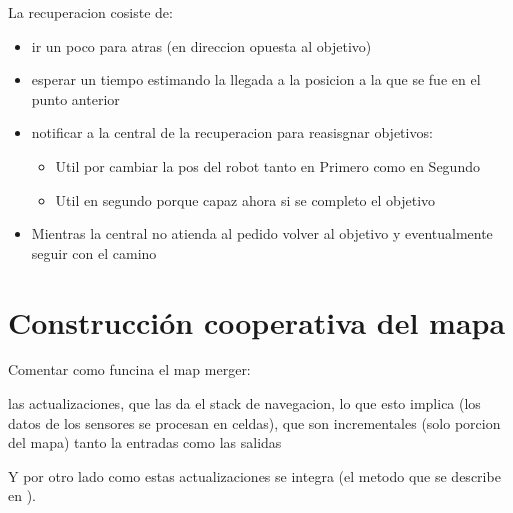 La recuperacion cosiste de:
\begin{itemize}
  \item  ir un poco para atras (en direccion opuesta al objetivo)
  \item  esperar un tiempo estimando la llegada a la posicion a la que se fue en el punto anterior
  \item  notificar a la central de la recuperacion para reasisgnar objetivos:
  \begin{itemize}
    \item Util por cambiar la pos del robot tanto en Primero como en Segundo
    \item Util en segundo porque capaz ahora si se completo el objetivo
  \end{itemize}
  \item  Mientras la central no atienda al pedido volver al objetivo y eventualmente seguir con el camino
\end{itemize}


\section{Construcción cooperativa del mapa}
Comentar como funcina el map merger:

las actualizaciones, que las da el stack de navegacion, lo que esto implica
(los datos de los sensores se procesan en celdas), que son incrementales (solo
porcion del mapa) tanto la entradas como las salidas

Y por otro lado como estas actualizaciones se integra (el metodo que se describe en \cite{stachniss2009robotic}).

























